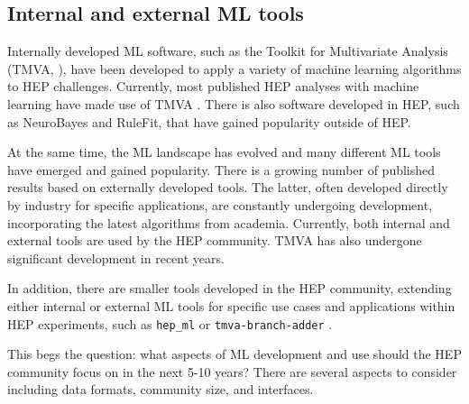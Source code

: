 \subsection{Internal and external ML tools}


Internally developed ML software, such as the Toolkit for Multivariate Analysis (TMVA, \cite{TMVA}), have been developed to apply a variety of machine learning algorithms to HEP challenges. Currently, most published HEP analyses with machine learning have made use of TMVA \cite{Citation}. There is also software developed in HEP, such as NeuroBayes\cite{neurobayes,neurobayes2} and RuleFit, that have gained popularity outside of HEP.

At the same time, the ML landscape has evolved and many different ML tools have emerged and gained popularity. There is a growing number of published results based on externally developed tools. The latter, often developed directly by industry for specific applications, are constantly undergoing development, incorporating the latest algorithms from academia. Currently, both internal and external tools are used by the HEP community. TMVA has also undergone significant development in recent years.

In addition, there are smaller tools developed in the HEP community, extending either internal or external ML tools for specific use cases and applications within HEP experiments, such as \texttt{hep\_ml} \cite{hep_ml} or \texttt{tmva-branch-adder} \cite{tmva-branch-adder}.

This begs the question: what aspects of ML development and use should the HEP community focus on in the next 5-10 years? There are several aspects to consider including data formats, community size, and interfaces.

